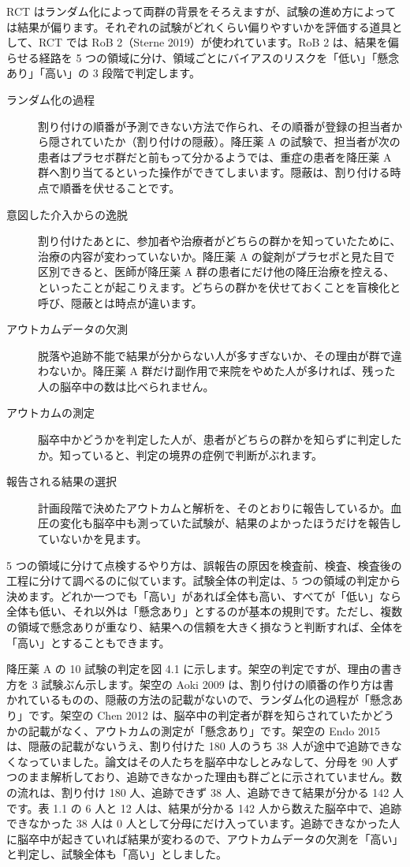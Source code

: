 RCT はランダム化によって両群の背景をそろえますが、試験の進め方によっては結果が偏ります。それぞれの試験がどれくらい偏りやすいかを評価する道具として、RCT では RoB 2（Sterne 2019）が使われています。RoB 2 は、結果を偏らせる経路を 5 つの領域に分け、領域ごとにバイアスのリスクを「低い」「懸念あり」「高い」の 3 段階で判定します。

\begin{description}
\item[ランダム化の過程] 割り付けの順番が予測できない方法で作られ、その順番が登録の担当者から隠されていたか（割り付けの隠蔽）。降圧薬 A の試験で、担当者が次の患者はプラセボ群だと前もって分かるようでは、重症の患者を降圧薬 A 群へ割り当てるといった操作ができてしまいます。隠蔽は、割り付ける時点で順番を伏せることです。
\item[意図した介入からの逸脱] 割り付けたあとに、参加者や治療者がどちらの群かを知っていたために、治療の内容が変わっていないか。降圧薬 A の錠剤がプラセボと見た目で区別できると、医師が降圧薬 A 群の患者にだけ他の降圧治療を控える、といったことが起こりえます。どちらの群かを伏せておくことを盲検化と呼び、隠蔽とは時点が違います。
\item[アウトカムデータの欠測] 脱落や追跡不能で結果が分からない人が多すぎないか、その理由が群で違わないか。降圧薬 A 群だけ副作用で来院をやめた人が多ければ、残った人の脳卒中の数は比べられません。
\item[アウトカムの測定] 脳卒中かどうかを判定した人が、患者がどちらの群かを知らずに判定したか。知っていると、判定の境界の症例で判断がぶれます。
\item[報告される結果の選択] 計画段階で決めたアウトカムと解析を、そのとおりに報告しているか。血圧の変化も脳卒中も測っていた試験が、結果のよかったほうだけを報告していないかを見ます。
\end{description}

5 つの領域に分けて点検するやり方は、誤報告の原因を検査前、検査、検査後の工程に分けて調べるのに似ています。試験全体の判定は、5 つの領域の判定から決めます。どれか一つでも「高い」があれば全体も高い、すべてが「低い」なら全体も低い、それ以外は「懸念あり」とするのが基本の規則です。ただし、複数の領域で懸念ありが重なり、結果への信頼を大きく損なうと判断すれば、全体を「高い」とすることもできます。

降圧薬 A の 10 試験の判定を図 4.1 に示します。架空の判定ですが、理由の書き方を 3 試験ぶん示します。架空の Aoki 2009 は、割り付けの順番の作り方は書かれているものの、隠蔽の方法の記載がないので、ランダム化の過程が「懸念あり」です。架空の Chen 2012 は、脳卒中の判定者が群を知らされていたかどうかの記載がなく、アウトカムの測定が「懸念あり」です。架空の Endo 2015 は、隠蔽の記載がないうえ、割り付けた 180 人のうち 38 人が途中で追跡できなくなっていました。論文はその人たちを脳卒中なしとみなして、分母を 90 人ずつのまま解析しており、追跡できなかった理由も群ごとに示されていません。数の流れは、割り付け 180 人、追跡できず 38 人、追跡できて結果が分かる 142 人です。表 1.1 の 6 人と 12 人は、結果が分かる 142 人から数えた脳卒中で、追跡できなかった 38 人は 0 人として分母にだけ入っています。追跡できなかった人に脳卒中が起きていれば結果が変わるので、アウトカムデータの欠測を「高い」と判定し、試験全体も「高い」としました。

